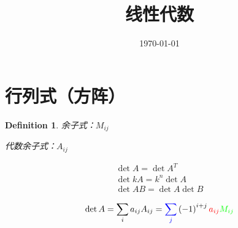 \documentclass{article}
\title{线性代数}
\author{}
\date{\today}
\begin{document}
\hypersetup{
    hidelinks,
    allcolors = black,
    breaklinks = true
}

\newtheorem{definition}{Definition}[subsection]
\newtheorem{theorem}{Theorem}[subsection]
\newtheorem{corollary}{Corollary}[theorem]
\renewcommand{\proofname}{\indent\bf Proof}

\def\v{\boldsymbol v}
\def\w{\boldsymbol w}
\def\ev{\boldsymbol e}
\def\pv{\boldsymbol p}

\newcommand{\abs}[1]{\left|#1\right|}
\newcommand{\p}[1]{\left(#1\right)}

\begin{titlepage}
    \maketitle
\end{titlepage}

\tableofcontents
\newpage

\section{行列式（方阵）}

\begin{definition}
    余子式：$M_{ij}$

    代数余子式：$A_{ij}$
\end{definition}

\[\begin{gathered}
        \det A=\det A^T\\
        \det kA=k^n\det A\\
        \det AB=\det A\det B
    \end{gathered}\]

\[\det A=\sum_ia_{ij}A_{ij}={\textcolor{blue}{\sum_j}}\p{-1}^{i+j}\textcolor{red}{a_{ij}}\textcolor{green}{M_{ij}}\]
\end{document}
